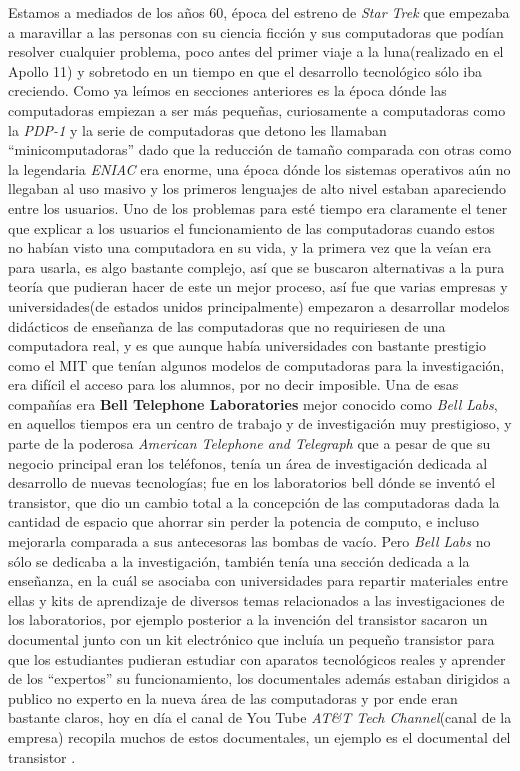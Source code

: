 \documentclass[letterpaper,12pt,oneside]{book}
\begin{document}
		Estamos a mediados de los años 60, época del estreno de \textit{Star Trek} que empezaba a maravillar a las personas con su ciencia ficción  y sus
		computadoras que podían resolver cualquier problema, poco antes del primer viaje a la luna(realizado en el Apollo 11) y sobretodo
		en un tiempo en que el desarrollo tecnológico sólo iba creciendo. Como ya leímos en secciones
		anteriores
		es la época dónde las computadoras empiezan a ser más pequeñas, curiosamente a computadoras como la \textit{PDP-1} y la serie de computadoras que detono les llamaban 
		``minicomputadoras'' dado que la reducción de tamaño comparada con otras como la legendaria \textit{ENIAC} era enorme, una época dónde
		los sistemas operativos aún no llegaban al uso masivo y los primeros lenguajes de alto nivel estaban apareciendo entre los usuarios. Uno de los 
		problemas para esté tiempo era claramente el tener que explicar
		a los usuarios el funcionamiento de las computadoras cuando estos no habían visto una computadora en su vida, y la primera vez que la veían era para usarla,
		es algo bastante complejo, así que se buscaron alternativas a la pura teoría que pudieran hacer de este un mejor proceso, así fue que varias empresas 
		y universidades(de estados unidos principalmente) empezaron a desarrollar modelos didácticos de enseñanza de las computadoras que no requiriesen de una computadora 
		real, y es que aunque había universidades con bastante prestigio como el MIT que tenían algunos modelos de computadoras para la investigación, era difícil
		el acceso para los alumnos, por no decir imposible\cite[p. 71]{ceruzzi_computing_2012}. Una de esas compañías era \textbf{Bell Telephone 
		Laboratories} mejor conocido como \textit{Bell Labs}, en aquellos tiempos era un centro de trabajo y de investigación muy prestigioso, y parte de la
		poderosa \textit{American Telephone and Telegraph} que a pesar de que su negocio
		principal eran los teléfonos, tenía un área de investigación dedicada al desarrollo de nuevas tecnologías; fue en los laboratorios bell dónde se inventó el 		
		transistor,
		que dio un cambio total a la concepción de las computadoras dada la cantidad de espacio que  ahorrar sin perder la potencia de computo, e incluso mejorarla
		comparada a sus antecesoras las bombas de vacío\cite[p. 161]{isaacson_innovators_2014}. Pero \textit{Bell Labs} no sólo se dedicaba a la investigación,
		también tenía una sección dedicada a la enseñanza, en la cuál se asociaba con universidades para repartir materiales entre ellas y kits de aprendizaje de diversos
		temas relacionados a las investigaciones de los laboratorios, por ejemplo posterior a la invención del transistor sacaron un documental junto
		con un kit electrónico que incluía un pequeño transistor para que los estudiantes pudieran estudiar con aparatos tecnológicos reales y aprender
		de los ``expertos'' su funcionamiento, los documentales además estaban dirigidos a publico no experto en la nueva área de las computadoras y por ende
		eran bastante claros, hoy en día el canal de You Tube \textit{AT\&T Tech Channel}(canal de la empresa) recopila muchos de estos documentales, un ejemplo es el 
		documental del transistor \cite{att_tech_channel_transistor_2015}.
		
\end{document}
